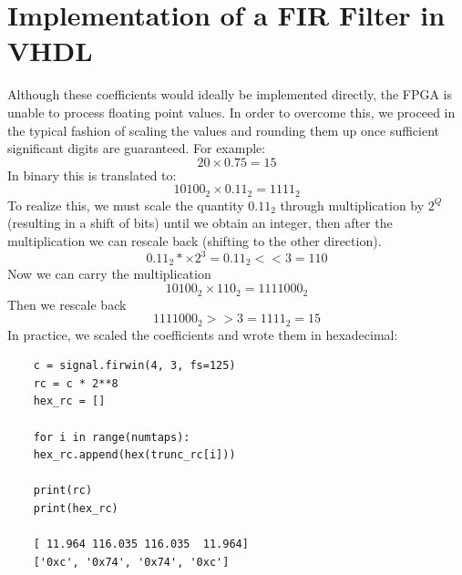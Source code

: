 \documentclass[11pt,a4paper,twocolumn]{IEEEtran}
\begin{document}
	\section{Implementation of a FIR Filter in VHDL}
	Although these coefficients would ideally be implemented directly, the FPGA is unable to process floating point values. In order to overcome this, we proceed in the typical fashion of scaling the values and rounding them up once sufficient significant digits are guaranteed.
	For example:\\$$20\times 0.75 = 15$$ In binary this is translated to:
	$$ 10100_2 \times 0.11_2 = 1111_2$$
	To realize this, we must scale the quantity $0.11_2$ through multiplication by $2^Q$ (resulting in a shift of bits) until we obtain an integer, then after the multiplication we can rescale back (shifting to the other direction).
	$$0.11_2 *\times 2^3 = 0.11_2 <<3 = 110$$
	Now we can carry the multiplication
	$$10100_2\times 110_2 = 1111000_2$$
	Then we rescale back
	$$1111000_2 >> 3 = 1111_2 = 15$$
	In practice, we scaled the coefficients and wrote them in hexadecimal:
	\begin{lstlisting}
	c = signal.firwin(4, 3, fs=125)
	rc = c * 2**8
	hex_rc = []
	
	for i in range(numtaps):
	hex_rc.append(hex(trunc_rc[i]))
	
	print(rc)    
	print(hex_rc)
	
	[ 11.964 116.035 116.035  11.964]
	['0xc', '0x74', '0x74', '0xc']
	\end{lstlisting}
\end{document}
